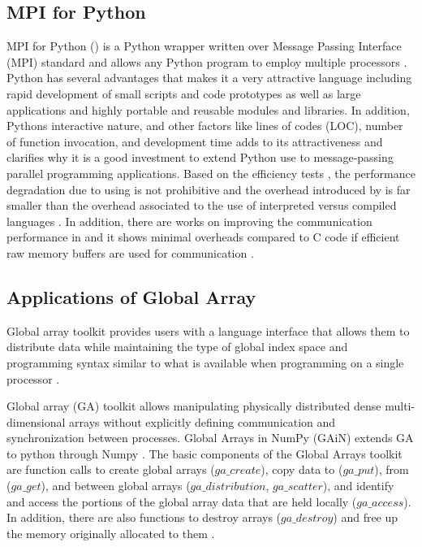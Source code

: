 \subsection{MPI for Python }
MPI for Python () is a Python wrapper written over Message Passing Interface (MPI) standard and allows any Python program to employ multiple processors \cite{Dalcin:2011aa, Dalcin:2005aa}.
Python has several advantages that makes it a very attractive language including rapid development of small scripts and code prototypes as well as large applications and highly portable and reusable modules and libraries.
In addition, Python\textsc{}s interactive nature, and other factors like lines of codes (LOC), number of function invocation, and development time adds to its attractiveness and clarifies why it is a good investment to extend Python use to message-passing parallel programming applications.
Based on the efficiency tests \cite{Dalcin:2011aa, Dalcin:2005aa}, the performance degradation due to using  is not prohibitive and the overhead introduced by  is far smaller than the overhead associated to the use of interpreted versus compiled languages \cite{GAiN}.
In addition, there are works on improving the communication performance in  and it shows minimal overheads compared to C code if efficient raw memory buffers are used for communication \cite{Dalcin:2011aa}.

\subsection{Applications of Global Array}
Global array toolkit provides users with a language interface that allows them to distribute data while maintaining the type of global index space and programming syntax similar to what is available when programming on a single processor \cite{GA}.

Global array (GA) toolkit allows manipulating physically distributed dense multi-dimensional arrays without explicitly defining communication and synchronization between processes.
Global Arrays in NumPy (GAiN) extends GA to python through Numpy \cite{GAiN}. 
The basic components of the Global Arrays toolkit are function calls to create global arrays ($ga\_create$), copy data to ($ga\_put$), from ($ga\_get$), and between global arrays ($ga\_distribution$, $ga\_scatter$), and identify and access the portions of the global array data that are held locally ($ga\_access$). 
In addition, there are also functions to destroy arrays ($ga\_destroy$) and free up the memory originally allocated to them \cite{GAiN}.

